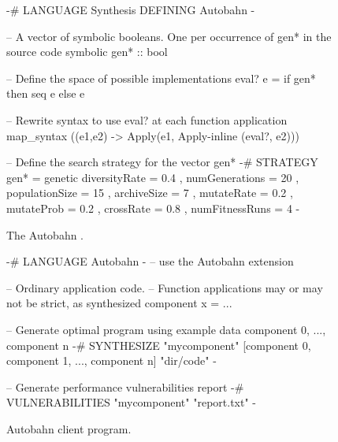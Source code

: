 \begin{figure}[t]
        
\centering
\begin{mylisting}
{-# LANGUAGE Synthesis DEFINING Autobahn -}

-- A vector of symbolic booleans. One per occurrence of gen* in the source code
symbolic gen* :: bool

-- Define the space of possible implementations
eval? e = if gen* then seq e else e

-- Rewrite syntax to use eval? at each function application
map_syntax (\Apply(e1,e2) -> Apply(e1, Apply-inline (eval?, e2)))

-- Define the search strategy for the vector gen*
{-# STRATEGY gen* = 
    genetic { diversityRate = 0.4
               , numGenerations = 20
               , populationSize = 15
               , archiveSize = 7
               , mutateRate = 0.2
               , mutateProb = 0.2
               , crossRate = 0.8
               , numFitnessRuns = 4 }
-}
\end{mylisting}
\caption{The Autobahn \rasp.  
}
\label{fig:autobahn-via-synthesis}
\end{figure}

\begin{figure}[t]
        
\centering
\begin{mylisting}
{-# LANGUAGE Autobahn -}    -- use the Autobahn extension

-- Ordinary application code.  
-- Function applications may or may not be strict, as synthesized
component x = ...

-- Generate optimal program using example data component 0, ..., component n
{-# SYNTHESIZE "mycomponent" 
        [component 0, component 1, ..., component n] "dir/code" -}

-- Generate performance vulnerabilities report
{-# VULNERABILITIES "mycomponent" "report.txt" -}
\end{mylisting}
\caption{Autobahn client program.}
\label{fig:autobahn-client}
\end{figure}

